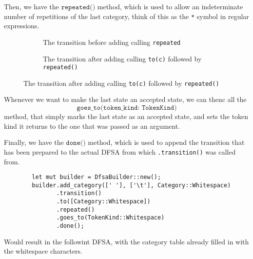 \documentclass{article}
\newcommand{\code}[1]{\texttt{#1}}
\begin{document}
Then, we have the $\code{repeated()}$ method, which is used to allow an
indeterminate number of repetitions of the last category, think of this as the
\code{*} symbol in regular expressions.

\begin{figure}[H]
    \begin{subfigure}[t]{0.5\textwidth}
        \centering
        \caption{The transition before adding calling \code{repeated}}
    \end{subfigure}
    \begin{subfigure}[t]{0.5\textwidth}
        \centering
        \caption{The transition after adding calling \code{to(c)} followed by  \code{repeated()}}
    \end{subfigure}
\end{figure}


Whenever we want to make the last state an accepted state, we can thenc all the
$$\code{goes\_to(token\_kind: TokenKind)}$$ method, that simply marks the last state as
an accepted state, and sets the token kind it returns to the one that was passed
as an argument.

Finally, we have the $\code{done()}$ method, which is used to append the transition that has been prepared to the actual DFSA from which \code{.transition()} was called from.


\begin{mainbox}{}
    \lstset{xleftmargin=1cm, aboveskip=0pt, belowskip=0pt}
    \begin{lstlisting}
        let mut builder = DfsaBuilder::new();
        builder.add_category([' '], ['\t'], Category::Whitespace)
               .transition()
               .to([Category::Whitespace])
               .repeated()
               .goes_to(TokenKind::Whitespace)
               .done();
    \end{lstlisting}
\end{mainbox}

Would result in the followint DFSA, with the category table already filled in
with the whitespace characters.
\end{document}
